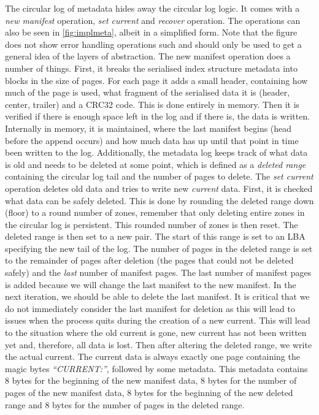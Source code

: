 The circular log of metadata hides away the circular log logic. It comes with a \textit{new manifest} operation, \textit{set current} and \textit{recover} operation. The operations can also be seen in  \autoref{fig:implmeta}, albeit in a simplified form. Note that the figure does not show error handling operations such and should only be used to get a general idea of the layers of abstraction. The new manifest operation does a number of things. First, it breaks the serialised index structure metadata into blocks in the size of pages. For each page it adds a small header, containing how much of the page is used, what fragment of the serialised data it is (header, center, trailer) and a CRC32 code. This is done entirely in memory. Then it is verified if there is enough space left in the log and if there is, the data is written. Internally in memory, it is maintained, where the last manifest begins (head before the append occurs) and how much data has up until that point in time been written to the log. Additionally, the metadata log keeps track of what data is old and needs to be deleted at some point, which is defined as a \textit{deleted range} containing the circular log tail and the number of pages to delete. The \textit{set current} operation deletes old data and tries to write new \textit{current} data. First, it is checked what data can be safely deleted. This is done by rounding the deleted range down (floor) to a round number of zones, remember that only deleting entire zones in the circular log is persistent. This rounded number of zones is then reset. The deleted range is then set to a new pair. The start of this range is set to an LBA specifying the new tail of the log. The number of pages in the deleted range is set to the remainder of pages after deletion (the pages that could not be deleted safely) and the \textit{last} number of manifest pages. The last number of manifest pages is added because we will change the last manifest to the new manifest. In the next iteration, we should be able to delete the last manifest. It is critical that we do not immediately consider the last manifest for deletion as this will lead to issues when the process quits during the creation of a new current. This will lead to the situation where the old current is gone, new current has not been written yet and, therefore, all data is lost. Then after altering the deleted range, we write the actual current. The current data is always exactly one page containing the magic bytes \textit{``CURRENT:''}, followed by some metadata. This metadata contains 8 bytes for the beginning of the new manifest data, 8 bytes for the number of pages of the new manifest data, 8 bytes for the beginning of the new deleted range and 8 bytes for the number of pages in the deleted range.


